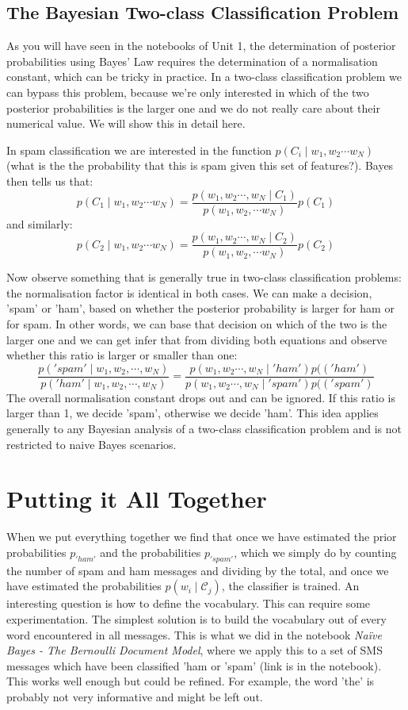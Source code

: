 \subsection{The Bayesian Two-class Classification  Problem}

As you will have seen in the notebooks of Unit 1, the determination of posterior probabilities using Bayes' Law requires the determination of a
normalisation constant, which can be tricky in practice. In a two-class classification problem
we can bypass this problem, because we're only interested in which of the two posterior probabilities is the larger one and we do not really care about their numerical value.
We will show this in detail here.

In spam classification we are interested in the function $p(C_i \mid w_1, w_2 \cdots w_N)$ (what is the the probability that this is spam given this set of features?). Bayes
then tells us that:
$$
p(C_1 \mid w_1, w_2 \cdots w_N) =  \frac{p(w_1, w_2 \cdots, w_N \mid C_1)}{p(w_1, w_2, \cdots w_N)} p(C_1)
$$
and similarly:
$$
p(C_2 \mid w_1, w_2 \cdots w_N) =  \frac{p(w_1, w_2 \cdots, w_N \mid C_2)}{p(w_1, w_2, \cdots w_N)} p(C_2)
$$

Now observe something that is generally true in two-class classification problems: the normalisation factor is identical in both cases.  We can make a decision, 'spam' or
'ham', based on whether the posterior probability is larger for ham or for spam. In other words, we can base that decision on which of the two is the larger one and we
can get infer that from dividing both equations and observe whether this ratio is larger or smaller than one:
$$
\frac{p('spam' \mid w_1, w_2, \cdots, w_N)}{p('ham' \mid w_1, w_2, \cdots, w_N)} =
\frac{p(w_1, w_2 \cdots, w_N \mid 'ham')p(('ham')}{p(w_1, w_2 \cdots, w_N \mid 'spam')p(('spam')}
$$
The overall normalisation constant drops out and can be ignored.  If this ratio is larger than 1, we decide 'spam', otherwise we decide 'ham'.
This idea applies generally to any Bayesian analysis of a two-class classification problem and is not restricted to naive Bayes scenarios.
\section{Putting it All Together}
When we put everything together we find that once we have estimated the prior probabilities $p_{'ham'}$ and
the probabilities $p_{'spam'}$, which we simply do by counting the number of spam and ham messages and dividing by the total, and once we have estimated the probabilities $p(w_i \mid \mathcal{C}_j)$, the classifier is trained. An interesting question is how to define the vocabulary. This can require some experimentation. The simplest solution is to build the vocabulary out of every word encountered in all messages. This is what we did
in the notebook \emph{Na\"ive Bayes - The Bernoulli Document Model}, where we apply this to a set
of SMS messages which have been classified 'ham or 'spam' (link is in the notebook). This works well
enough but could be refined. For example, the word
'the' is probably not very informative and might be left out.

